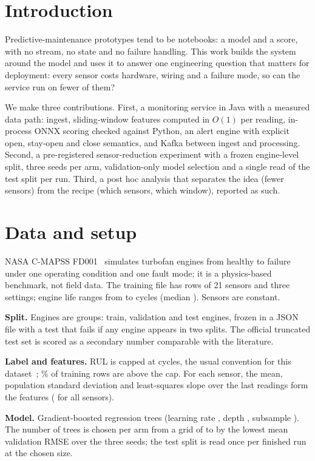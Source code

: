 \documentclass[conference]{IEEEtran}
\begin{document}
\section{Introduction}
Predictive-maintenance prototypes tend to be notebooks: a model and a score, with no stream, no state and no
failure handling. This work builds the system around the model and uses it to answer one engineering
question that matters for deployment: every sensor costs hardware, wiring and a failure mode, so can the
service run on fewer of them?

We make three contributions. First, a monitoring service in Java with a measured data path: ingest,
sliding-window features computed in $O(1)$ per reading, in-process ONNX scoring checked against Python, an
alert engine with explicit open, stay-open and close semantics, and Kafka between ingest and processing.
Second, a pre-registered sensor-reduction experiment with a frozen engine-level split, three seeds per arm,
validation-only model selection and a single read of the test split per run. Third, a post hoc analysis that
separates the idea (fewer sensors) from the recipe (which sensors, which window), reported as such.

\section{Data and setup}
NASA C-MAPSS FD001~\cite{saxena2008} simulates \EdaEngines{} turbofan engines from healthy to failure under one
operating condition and one fault mode; it is a physics-based benchmark, not field data. The training file
has \EdaRows{} rows of 21 sensors and three settings; engine life ranges from \EdaLifeMin{} to \EdaLifeMax{}
cycles (median \EdaLifeMedian{}). Sensors \ConstantSensors{} are constant.

\textbf{Split.} Engines are groups: \SplitTrain{} train, \SplitVal{} validation and \SplitTest{} test engines, frozen in a JSON
file with a test that fails if any engine appears in two splits. The official truncated test set is scored as a
secondary number comparable with the literature.

\textbf{Label and features.} RUL is capped at \LabelCap{} cycles, the usual convention for this
dataset~\cite{heimes2008}; \EdaShareRowsAboveCap{}\% of training rows are above the cap. For each sensor,
the mean, population standard deviation and least-squares slope over the last \Window{} readings form the
features (\CfgFeaturesFull{} for all sensors).

\textbf{Model.} Gradient-boosted regression trees (learning rate \CfgLearningRate{}, depth \CfgMaxDepth{},
subsample \CfgSubsample{}). The number of trees is chosen per arm from a grid of \CfgGridMin{} to \CfgGridMax{} by the lowest mean validation RMSE over the three seeds; the test split is
read once per finished run at the chosen size.
\end{document}

